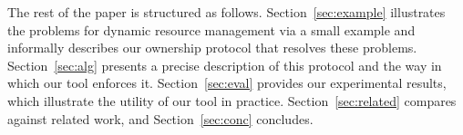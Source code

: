The rest of the paper is structured as follows.
Section~\ref{sec:example} illustrates the problems for dynamic
resource management via a small example and informally describes our
ownership protocol that resolves these problems.
Section~\ref{sec:alg} presents a precise description of this protocol
and the way in which our tool enforces it.  Section~\ref{sec:eval}
provides our experimental results, which illustrate the utility of our
tool in practice.  Section~\ref{sec:related} compares against related
work, and Section~\ref{sec:conc} concludes.

